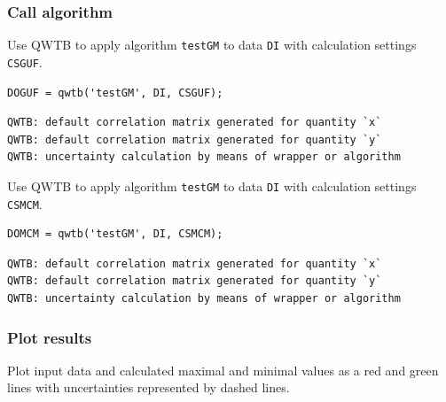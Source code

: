 \subsubsection*{Call algorithm}



Use QWTB to apply algorithm \texttt{testGM} to data \texttt{DI} with calculation settings \texttt{CSGUF}.

\begin{lstlisting}
DOGUF = qwtb('testGM', DI, CSGUF);
\end{lstlisting}
\begin{lstlisting}[language={},xleftmargin=5pt,frame=none]
QWTB: default correlation matrix generated for quantity `x`
QWTB: default correlation matrix generated for quantity `y`
QWTB: uncertainty calculation by means of wrapper or algorithm

\end{lstlisting}


Use QWTB to apply algorithm \texttt{testGM} to data \texttt{DI} with calculation settings \texttt{CSMCM}.

\begin{lstlisting}
DOMCM = qwtb('testGM', DI, CSMCM);
\end{lstlisting}
\begin{lstlisting}[language={},xleftmargin=5pt,frame=none]
QWTB: default correlation matrix generated for quantity `x`
QWTB: default correlation matrix generated for quantity `y`
QWTB: uncertainty calculation by means of wrapper or algorithm

\end{lstlisting}


{}
\subsubsection*{Plot results}



Plot input data and calculated maximal and minimal values as a red and green lines with
uncertainties represented by dashed lines.

